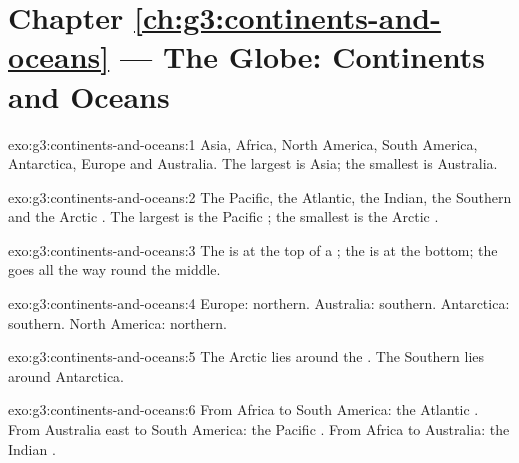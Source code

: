 \section*{Chapter \ref{ch:g3:continents-and-oceans} --- The Globe: Continents and Oceans}

\begin{solution}{exo:g3:continents-and-oceans:1}
Asia, Africa, North America, South America, Antarctica, Europe and
Australia. The largest is Asia; the smallest is Australia.
\end{solution}

\begin{solution}{exo:g3:continents-and-oceans:2}
The Pacific, the Atlantic, the Indian, the Southern and the Arctic .
The largest is the Pacific ; the smallest is the Arctic .
\end{solution}

\begin{solution}{exo:g3:continents-and-oceans:3}
The  is at the top of a ; the  is at the bottom;
the  goes all the way round the middle.
\end{solution}

\begin{solution}{exo:g3:continents-and-oceans:4}
Europe: northern. Australia: southern. Antarctica: southern. North America:
northern.
\end{solution}

\begin{solution}{exo:g3:continents-and-oceans:5}
The Arctic  lies around the . The Southern  lies around
Antarctica.
\end{solution}

\begin{solution}{exo:g3:continents-and-oceans:6}
From Africa to South America: the Atlantic . From Australia east to
South America: the Pacific . From Africa to Australia: the Indian
.
\end{solution}

